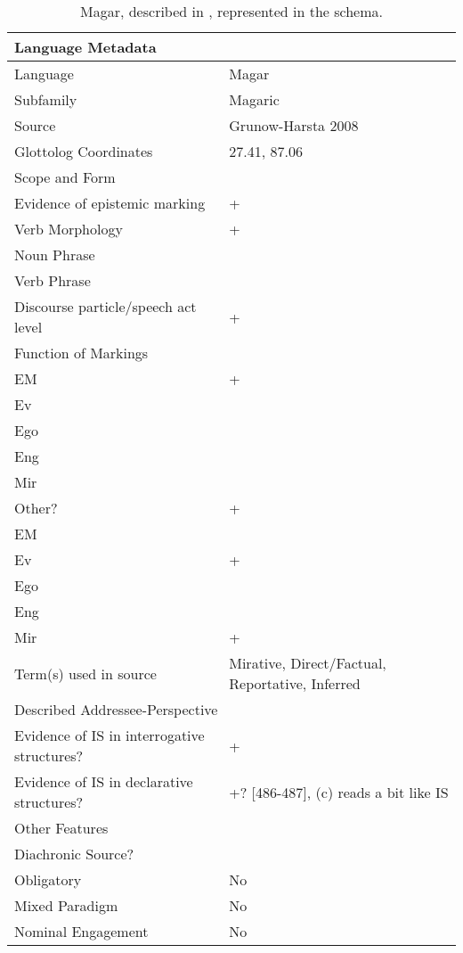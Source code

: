 \begin{table}
  \begin{tabular}{|l|l|}
  \hline\hline
  \multicolumn{2}{|l|}{Language Metadata} \\ \hline
  Language & Magar \\ \hline
  Subfamily & Magaric \\ \hline
  Source & Grunow-Harsta 2008 \\ \hline
  Glottolog Coordinates & 27.41, 87.06 \\ \hline \hline
  \multicolumn{2}{|l|}{Scope and Form} \\ \hline
  Evidence of epistemic marking & + \\ \hline
  Verb Morphology & + \\ \hline
  Noun Phrase &  \\ \hline
  Verb Phrase &  \\ \hline
  Discourse particle/speech act level & + \\ \hline \hline
  \multicolumn{2}{|l|}{Function of Markings} \\ \hline
  EM & + \\ \hline
  Ev &  \\ \hline
  Ego &  \\ \hline
  Eng &  \\ \hline
  Mir &  \\ \hline
  Other? & + \\ \hline \hline
  EM &  \\ \hline
  Ev & + \\ \hline
  Ego &  \\ \hline
  Eng &  \\ \hline
  Mir & + \\ \hline \hline
  Term(s) used in source & Mirative, Direct/Factual, Reportative, Inferred \\ \hline \hline
  \multicolumn{2}{|l|}{Described Addressee-Perspective} \\ \hline
  Evidence of IS in interrogative structures? & + \\ \hline
  Evidence of IS in declarative structures? & +? {[}486-487{]}, (c) reads a bit like IS \\ \hline \hline
  \multicolumn{2}{|l|}{Other Features} \\ \hline
  Diachronic Source? &  \\ \hline
  Obligatory & No \\ \hline 
  Mixed Paradigm & No \\ \hline
  Nominal Engagement & No \\ \hline \hline
  \end{tabular}
  \caption{Magar, described in , represented in the schema.}\label{t:Methods:SchemaExample}
  \end{table}

